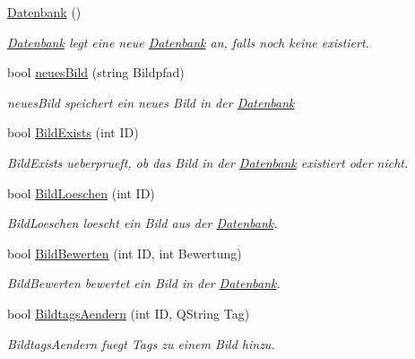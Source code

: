 \begin{DoxyCompactItemize}
\item 
\hyperlink{class_datenbank_a7d3ea0956998a887370d07e989ce91e0}{Datenbank} ()\hypertarget{class_datenbank_a7d3ea0956998a887370d07e989ce91e0}{}\label{class_datenbank_a7d3ea0956998a887370d07e989ce91e0}

\begin{DoxyCompactList}\small\item\em \hyperlink{class_datenbank}{Datenbank} legt eine neue \hyperlink{class_datenbank}{Datenbank} an, falls noch keine existiert. \end{DoxyCompactList}\item 
bool \hyperlink{class_datenbank_a7f4b8a305791e06232a6e5e618c05ed4}{neues\+Bild} (string Bildpfad)
\begin{DoxyCompactList}\small\item\em neues\+Bild speichert ein neues Bild in der \hyperlink{class_datenbank}{Datenbank} \end{DoxyCompactList}\item 
bool \hyperlink{class_datenbank_a82a097cc2818f0ebcce4c8d6c287ad2d}{Bild\+Exists} (int ID)
\begin{DoxyCompactList}\small\item\em Bild\+Exists ueberprueft, ob das Bild in der \hyperlink{class_datenbank}{Datenbank} existiert oder nicht. \end{DoxyCompactList}\item 
bool \hyperlink{class_datenbank_a994d146f7d2e61d76e8c9aa7341b82e2}{Bild\+Loeschen} (int ID)
\begin{DoxyCompactList}\small\item\em Bild\+Loeschen loescht ein Bild aus der \hyperlink{class_datenbank}{Datenbank}. \end{DoxyCompactList}\item 
bool \hyperlink{class_datenbank_a00b0d926e5e36212fef92285c8d572d8}{Bild\+Bewerten} (int ID, int Bewertung)
\begin{DoxyCompactList}\small\item\em Bild\+Bewerten bewertet ein Bild in der \hyperlink{class_datenbank}{Datenbank}. \end{DoxyCompactList}\item 
bool \hyperlink{class_datenbank_aa49f50a80d0453410ce15a88c8e2654b}{Bildtags\+Aendern} (int ID, Q\+String Tag)
\begin{DoxyCompactList}\small\item\em Bildtags\+Aendern fuegt Tags zu einem Bild hinzu. \end{DoxyCompactList}\item 

\end{DoxyCompactItemize}
